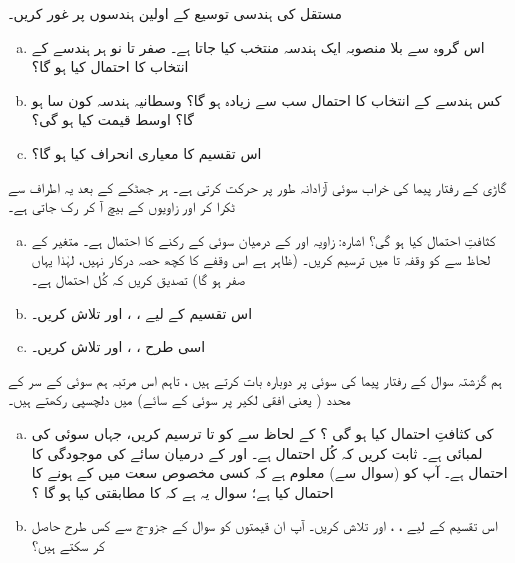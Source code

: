 مستقل  کی  ہندسی توسیع کے اولین     ہندسوں  پر غور کریں۔
\begin{enumerate}[a.]
\item
اس گروہ سے بلا منصوبہ ایک ہندسہ منتخب کیا جاتا ہے۔ صفر تا نو ہر ہندسے کے انتخاب کا احتمال کیا ہو گا؟
\item
 کس ہندسے کے انتخاب کا احتمال سب سے زیادہ ہو گا؟ وسطانیہ ہندسہ کون سا ہو گا؟ اوسط قیمت کیا ہو گی؟
\item
اس تقسیم کا معیاری انحراف کیا ہو گا؟
\end{enumerate}
گاڑی کے رفتار پیما کی خراب سوئی آزادانہ طور پر حرکت کرتی ہے۔ ہر جھٹکے کے بعد یہ اطراف سے ٹکرا کر  اور  زاویوں کے بیچ آ کر رک جاتی ہے۔
\begin{enumerate}[a.] 
\item
کثافتِ احتمال  کیا ہو گی؟   اشارہ: زاویہ  اور  کے درمیان سوئی کے رکنے کا احتمال  ہے۔ متغیر  کے لحاظ سے  کو وقفہ تا  میں  ترسیم کریں۔  (ظاہر ہے اس وقفے کا کچھ حصہ درکار نہیں، لہٰذا  یہاں صفر ہو گا) تصدیق کریں کہ کُل احتمال  ہے۔
\item
اس تقسیم کے لیے ،  ، اور  تلاش کریں۔
\item
 اسی طرح ، ،  اور   تلاش کریں۔
\end{enumerate}
 ہم گزشتہ سوال کے رفتار پیما کی سوئی پر دوبارہ بات کرتے ہیں ، تاہم اس مرتبہ ہم سوئی کے سر کے  محدد ( یعنی افقی لکیر پر سوئی کے سائے) میں دلچسپی رکھتے ہیں۔
\begin{enumerate}[a.]
\item 
  کی کثافتِ احتمال کیا ہو گی ؟  کے لحاظ سے  کو  تا   ترسیم کریں، جہاں   سوئی کی لمبائی ہے۔ ثابت کریں کہ کُل احتمال  ہے۔   اور  کے درمیان سائے  کی موجودگی کا احتمال  ہے۔ آپ  کو (سوال  سے)  معلوم ہے کہ کسی مخصوص سعت میں  کے ہونے  کا احتمال کیا ہے؛ سوال یہ ہے کہ  کا مطابقتی  کیا ہو گا ؟
\item
 اس تقسیم کے لیے ،  ، اور  تلاش کریں۔ آپ ان قیمتوں کو سوال  کے جزو-ج سے کس طرح حاصل کر سکتے ہیں؟
 \end{enumerate}
